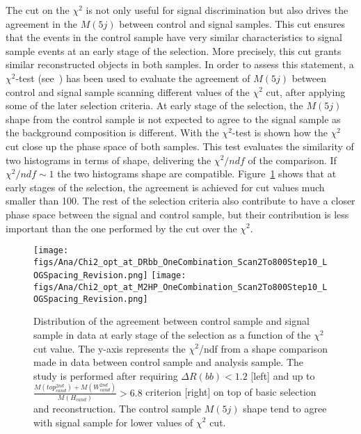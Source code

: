 The cut on the $\chi^{2}$ is not only useful for signal discrimination but also drives the agreement in the $M(5j)$ between control and signal samples. This cut ensures that the events in the control sample have very similar characteristics to signal sample events at an early stage of the selection. More precisely, this cut grants similar reconstructed objects in both samples. In order to assess this statement, a $\chi^{2}$-test (see~\cite{2006physics...5123G}) has been used to evaluate the agreement of $M(5j)$ between control and signal sample scanning different values of the $\chi^{2}$ cut, after applying some of the later selection criteria. At early stage of the selection, the $M(5j)$ shape from the control sample is not expected to agree to the signal sample as the background composition is different. With the $\chi^{2}$-test is shown how the $\chi^{2}$ cut close up the phase space of both samples. This test evaluates the similarity of two histograms in terms of shape, delivering the $\chi^{2}/ndf$ of the comparison. If ${\chi^{2}/ndf\sim 1}$ the two histograms shape are compatible. Figure~\ref{fig:optchi2} shows that at early stages of the selection, the agreement is achieved for cut values much smaller than 100. The rest of the selection criteria also contribute to have a closer phase space between the signal and control sample, but their contribution is less important than the one performed by the cut over the $\chi^{2}$.

\begin{figure}[!Hhtbp]
  \begin{center}
    \texttt{[image: figs/Ana/Chi2\_opt\_at\_DRbb\_OneCombination\_Scan2To800Step10\_LOGSpacing\_Revision.png]} %
    \texttt{[image: figs/Ana/Chi2\_opt\_at\_M2HP\_OneCombination\_Scan2To800Step10\_LOGSpacing\_Revision.png]}
    \caption{Distribution of the agreement between control sample and signal sample in data at early stage of the selection as a function of the $\chi^2$ cut value. The y-axis represents the $\chi^{2}$/ndf from a shape comparison made in data between control sample and analysis sample. The study is performed after requiring $\Delta R(bb) <1.2$ [left] and up to $\frac{M(top^{2nd}_{cand})+M(W^{2nd}_{cand})}{M(H_{cand})}>6.8$ criterion [right] on top of basic selection and reconstruction. The control sample $M(5j)$ shape tend to agree with signal sample for lower values of $\chi^2$ cut.}
    \label{fig:optchi2}
  \end{center}
\end{figure}

